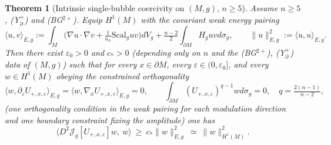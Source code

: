 \documentclass[11pt,reqno,a4paper]{amsart}
\numberwithin{equation}{section}
\theoremstyle{plain}
\newtheorem{theorem}{Theorem}[section]
\newcommand{\Scal}{\mathrm{Scal}}
\theoremstyle{remark}
\theoremstyle{plain}
\begin{document}
\begin{theorem}[Intrinsic single-bubble coercivity on $(M,g)$, $n\ge5$]\label{thm:intrinsic-single-gap}
Assume $n\ge5$, \textup{(Y$^+_{\partial}$)} and \textup{(BG$^{2+}$)}. Equip $H^1(M)$ with the covariant weak energy pairing
\[
\langle u,v\rangle_{E,g}
:=\int_M\Big(\nabla u\cdot\nabla v+\tfrac{1}{a_n}\Scal_guv\Big)dV_g
  +\tfrac{n-2}{2}\int_{\partial M}H_guvd\sigma_g,
\qquad
\|u\|_{E,g}^2:=\langle u,u\rangle_{E,g}.
\]
Then there exist $\varepsilon_0>0$ and $c_\ast>0$ (depending only on $n$ and the \textup{(BG$^{2+}$)}, \textup{(Y$^+_{\partial}$)} data of $(M,g)$) such that for every $x\in\partial M$, every $\varepsilon\in(0,\varepsilon_0]$, and every $w\in H^1(M)$ obeying the \emph{constrained orthogonality}
\begin{equation}\label{eq:esc-orthog-gauge-final}
\langle w,\partial_\varepsilon U_{+,x,\varepsilon}\rangle_{E,g}
=\langle w,\nabla_x U_{+,x,\varepsilon}\rangle_{E,g}=0,
\qquad
\int_{\partial M} (U_{+,x,\varepsilon})^{q-1}wd\sigma_g=0,
\quad q=\tfrac{2(n-1)}{n-2},
\end{equation}
(one orthogonality condition in the weak pairing for each modulation direction and one boundary constraint fixing the amplitude) one has
\begin{equation}\label{eq:intrinsic-gap-final}
\big\langle D^2\mathcal J_g[U_{+,x,\varepsilon}]w,\ w\big\rangle
\ \ge\ c_\ast\|w\|_{E,g}^2
\ \simeq\ \|w\|_{H^1(M)}^2 .
\end{equation}
\end{theorem}
\end{document}
